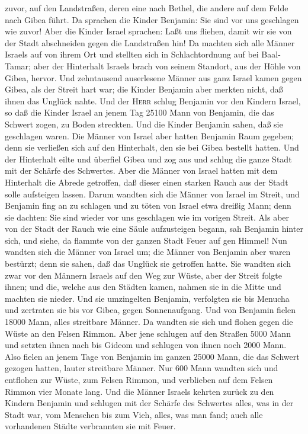 zuvor, auf den Landstraßen, deren eine nach Bethel, die andere auf dem
Felde nach Gibea führt.  Da sprachen die Kinder Benjamin:
Sie sind vor uns geschlagen wie zuvor! Aber die Kinder Israel sprachen:
Laßt uns fliehen, damit wir sie von der Stadt abschneiden gegen die
Landstraßen hin!  Da machten sich alle Männer Israels auf
von ihrem Ort und stellten sich in Schlachtordnung auf bei Baal-Tamar;
aber der Hinterhalt Israels brach von seinem Standort, aus der Höhle von
Gibea, hervor.  Und zehntausend auserlesene Männer aus
ganz Israel kamen gegen Gibea, als der Streit hart war; die Kinder
Benjamin aber merkten nicht, daß ihnen das Unglück nahte.
 Und der \textsc{Herr} schlug Benjamin vor den Kindern
Israel, so daß die Kinder Israel an jenem Tag 25100 Mann von Benjamin,
die das Schwert zogen, zu Boden streckten.  Und die
Kinder Benjamin sahen, daß sie geschlagen waren. Die Männer von Israel
aber hatten Benjamin Raum gegeben; denn sie verließen sich auf den
Hinterhalt, den sie bei Gibea bestellt hatten.  Und der
Hinterhalt eilte und überfiel Gibea und zog aus und schlug die ganze
Stadt mit der Schärfe des Schwertes.  Aber die Männer von
Israel hatten mit dem Hinterhalt die Abrede getroffen, daß dieser einen
starken Rauch aus der Stadt solle aufsteigen lassen. 
Darum wandten sich die Männer von Israel im Streit, und Benjamin fing an
zu schlagen und zu töten von Israel etwa dreißig Mann; denn sie dachten:
Sie sind wieder vor uns geschlagen wie im vorigen Streit.
 Als aber von der Stadt der Rauch wie eine Säule
aufzusteigen begann, sah Benjamin hinter sich, und siehe, da flammte von
der ganzen Stadt Feuer auf gen Himmel!  Nun wandten sich
die Männer von Israel um; die Männer von Benjamin aber waren bestürzt;
denn sie sahen, daß das Unglück sie getroffen hatte.  Sie
wandten sich zwar vor den Männern Israels auf den Weg zur Wüste, aber
der Streit folgte ihnen; und die, welche aus den Städten kamen, nahmen
sie in die Mitte und machten sie nieder.  Und sie
umzingelten Benjamin, verfolgten sie bis Menucha und zertraten sie bis
vor Gibea, gegen Sonnenaufgang.  Und von Benjamin fielen
18000 Mann, alles streitbare Männer.  Da wandten sie sich
und flohen gegen die Wüste an den Felsen Rimmon. Aber jene schlugen auf
den Straßen 5000 Mann und setzten ihnen nach bis Gideom und schlugen von
ihnen noch 2000 Mann.  Also fielen an jenem Tage von
Benjamin im ganzen 25000 Mann, die das Schwert gezogen hatten, lauter
streitbare Männer.  Nur 600 Mann wandten sich und
entflohen zur Wüste, zum Felsen Rimmon, und verblieben auf dem Felsen
Rimmon vier Monate lang.  Und die Männer Israels kehrten
zurück zu den Kindern Benjamin und schlugen mit der Schärfe des
Schwertes alles, was in der Stadt war, vom Menschen bis zum Vieh, alles,
was man fand; auch alle vorhandenen Städte verbrannten sie mit Feuer.

